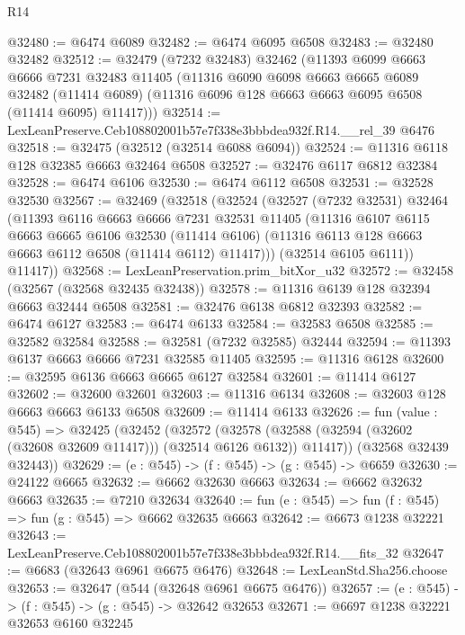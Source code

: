 \begin{lexlean}{R14}
\begin{coremodule}
@32480 := @6474 @6089
@32482 := @6474 @6095 @6508
@32483 := @32480 @32482
@32512 := @32479
    (@7232 @32483)
    @32462
    (@11393
      @6099
      @6663
      @6666
      @7231
      @32483
      @11405
      (@11316
        @6090
        @6098
        @6663
        @6665
        @6089
        @32482
        (@11414 @6089)
        (@11316 @6096 @128 @6663 @6663 @6095 @6508 (@11414 @6095) @11417)))
@32514 := LexLeanPreserve.Ceb108802001b57e7f338e3bbbdea932f.R14.__rel_39 @6476
@32518 := @32475 (@32512 (@32514 @6088 @6094))
@32524 := @11316 @6118 @128 @32385 @6663 @32464 @6508
@32527 := @32476 @6117 @6812 @32384
@32528 := @6474 @6106
@32530 := @6474 @6112 @6508
@32531 := @32528 @32530
@32567 := @32469
    (@32518
      (@32524
        (@32527
          (@7232 @32531)
          @32464
          (@11393
            @6116
            @6663
            @6666
            @7231
            @32531
            @11405
            (@11316
              @6107
              @6115
              @6663
              @6665
              @6106
              @32530
              (@11414 @6106)
              (@11316 @6113 @128 @6663 @6663 @6112 @6508 (@11414 @6112) @11417)))
          (@32514 @6105 @6111))
        @11417))
@32568 := LexLeanPreservation.prim_bitXor_u32
@32572 := @32458 (@32567 (@32568 @32435 @32438))
@32578 := @11316 @6139 @128 @32394 @6663 @32444 @6508
@32581 := @32476 @6138 @6812 @32393
@32582 := @6474 @6127
@32583 := @6474 @6133
@32584 := @32583 @6508
@32585 := @32582 @32584
@32588 := @32581 (@7232 @32585) @32444
@32594 := @11393 @6137 @6663 @6666 @7231 @32585 @11405
@32595 := @11316 @6128
@32600 := @32595 @6136 @6663 @6665 @6127 @32584
@32601 := @11414 @6127
@32602 := @32600 @32601
@32603 := @11316 @6134
@32608 := @32603 @128 @6663 @6663 @6133 @6508
@32609 := @11414 @6133
@32626 := fun (value : @545) =>
  @32425
    (@32452
      (@32572
        (@32578 (@32588 (@32594 (@32602 (@32608 @32609 @11417))) (@32514 @6126 @6132)) @11417))
      (@32568 @32439 @32443))
@32629 := (e : @545) -> (f : @545) -> (g : @545) -> @6659
@32630 := @24122 @6665
@32632 := @6662 @32630 @6663
@32634 := @6662 @32632 @6663
@32635 := @7210 @32634
@32640 := fun (e : @545) => fun (f : @545) => fun (g : @545) => @6662 @32635 @6663
@32642 := @6673 @1238 @32221
@32643 := LexLeanPreserve.Ceb108802001b57e7f338e3bbbdea932f.R14.__fits_32
@32647 := @6683 (@32643 @6961 @6675 @6476)
@32648 := LexLeanStd.Sha256.choose
@32653 := @32647 (@544 (@32648 @6961 @6675 @6476))
@32657 := (e : @545) -> (f : @545) -> (g : @545) -> @32642 @32653
@32671 := @6697
    @1238
    @32221
    @32653
    @6160
    @32245

\end{coremodule}
\end{lexlean}
